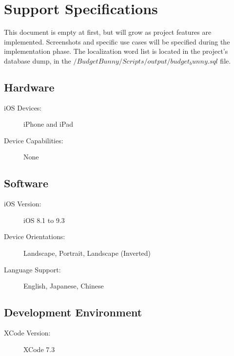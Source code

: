 \section{Support Specifications}

This document is empty at first, but will grow as project features are implemented.  
Screenshots and specific use cases will be specified during the implementation phase.
The localization word list is located in the project's database dump, in the $/BudgetBunny/Scripts/output/budget_bunny.sql$ file. 

\subsection{Hardware}
\begin{description}
\item[iOS Devices:] iPhone and iPad
\item[Device Capabilities:] None
\end{description}

\subsection{Software}
\begin{description}
\item[iOS Version:] iOS 8.1 to 9.3
\item[Device Orientations:] Landscape, Portrait, Landscape (Inverted)
\item[Language Support:] English, Japanese, Chinese
\end{description}

\subsection{Development Environment}
\begin{description}
\item[XCode Version:] XCode 7.3
\end{description}

